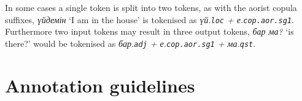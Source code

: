 \documentclass[a4paper,11pt, onecolumn,twoside]{article}
\newcommand{\gmk}[1]{{\rm {\sc \texttt{#1}}}}
\newcommand{\kazakh}[1]{{\em #1}}
\newcommand{\gloss}[1]{`#1'}
\begin{document}
In some cases a single token is split into two tokens, as with the aorist copula suffixes,
\kazakh{үйдемін} \gloss{I am in the house} is tokenised as \kazakh{үй.\gmk{loc} + е.\gmk{cop.aor.sg1}}. Furthermore
two input tokens may result in three output tokens, \kazakh{бар ма?} \gloss{is there?} would be
tokenised as \kazakh{бар.\gmk{adj} + е.\gmk{cop.aor.sg1} + ма.\gmk{qst}}.



\section{Annotation guidelines}\label{sec:annotation}


\end{document}
